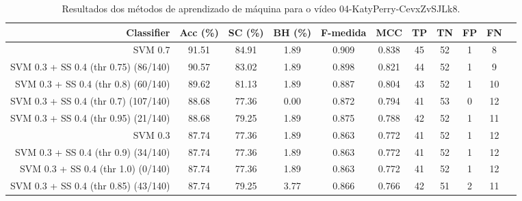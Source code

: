 \begin{table}[!htb]
\centering
\caption{Resultados dos métodos de aprendizado de máquina para o vídeo 04-KatyPerry-CevxZvSJLk8.}
\label{tab:04-KatyPerry-CevxZvSJLk8}
\begin{tabular}{r|c|c|c|c|c|c|c|c|c|c}
\hline\hline
Classifier & Acc (\%) & SC (\%) & BH (\%) & F-medida & MCC & TP & TN & FP & FN \\ \hline
SVM 0.7 & 91.51 & 84.91 & 1.89 & 0.909 & 0.838 & 45 & 52 & 1 & 8 \\ 
SVM 0.3 + SS 0.4 (thr 0.75) (86/140) & 90.57 & 83.02 & 1.89 & 0.898 & 0.821 & 44 & 52 & 1 & 9 \\ 
SVM 0.3 + SS 0.4 (thr 0.8) (60/140) & 89.62 & 81.13 & 1.89 & 0.887 & 0.804 & 43 & 52 & 1 & 10 \\ 
SVM 0.3 + SS 0.4 (thr 0.7) (107/140) & 88.68 & 77.36 & 0.00 & 0.872 & 0.794 & 41 & 53 & 0 & 12 \\ 
SVM 0.3 + SS 0.4 (thr 0.95) (21/140) & 88.68 & 79.25 & 1.89 & 0.875 & 0.788 & 42 & 52 & 1 & 11 \\ 
SVM 0.3 & 87.74 & 77.36 & 1.89 & 0.863 & 0.772 & 41 & 52 & 1 & 12 \\ 
SVM 0.3 + SS 0.4 (thr 0.9) (34/140) & 87.74 & 77.36 & 1.89 & 0.863 & 0.772 & 41 & 52 & 1 & 12 \\ 
SVM 0.3 + SS 0.4 (thr 1.0) (0/140) & 87.74 & 77.36 & 1.89 & 0.863 & 0.772 & 41 & 52 & 1 & 12 \\ 
SVM 0.3 + SS 0.4 (thr 0.85) (43/140) & 87.74 & 79.25 & 3.77 & 0.866 & 0.766 & 42 & 51 & 2 & 11 \\ 
\hline\hline
\end{tabular}
\end{table}
